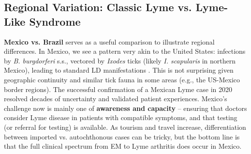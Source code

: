 \documentclass[11pt,letterpaper]{article}
\begin{document}
\subsection{Regional Variation: Classic Lyme vs. Lyme-Like Syndrome}
\textbf{Mexico vs. Brazil} serves as a useful comparison to illustrate regional differences. In Mexico, we see a pattern very akin to the United States: infections by \textit{B. burgdorferi} s.s., vectored by \textit{Ixodes} ticks (likely \textit{I. scapularis} in northern Mexico), leading to standard LD manifestations \citep{Colunga-Salas2020p}. This is not surprising given geographic continuity and similar tick fauna in some areas (e.g., the US-Mexico border regions). The successful confirmation of a Mexican Lyme case in 2020 resolved decades of uncertainty and validated patient experiences. Mexico's challenge now is mainly one of \textbf{awareness and capacity} – ensuring that doctors consider Lyme disease in patients with compatible symptoms, and that testing (or referral for testing) is available. As tourism and travel increase, differentiation between imported vs. autochthonous cases can be tricky, but the bottom line is that the full clinical spectrum from EM to Lyme arthritis does occur in Mexico.
\end{document}
